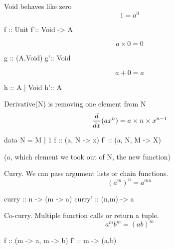 \documentclass{beamer}
\begin{document}







\begin{frame}[fragile]
Void behaves like zero
$$1= a^{0}$$
\begin{code}
f :: Unit
f':: Void -> A
\end{code}
$$a\times0 = 0$$
\begin{code}
g :: (A,Void)
g':: Void
\end{code}
$$a+0 = a$$
\begin{code}
h :: A | Void
h':: A
\end{code}
\end{frame}


\begin{frame}[fragile]
Derivative(N) is removing one element from N
$$ {d \over dx}(ax^{n}) = a \times n \times x^{n-1}$$
\begin{code}
data N = M | 1
f ::  (a, N -> x)
f' :: (a, N, M -> X)
\end{code}
($a$, which element we took out of N, the new function)
\end{frame}

\begin{frame}[fragile]
Curry. We can pass argument lists or chain functions.
$$ (a^{m})^{n} = a^{mn}$$

\begin{code}
curry :: n -> (m -> a)
curry' :: (n,m) -> a
\end{code}
\end{frame}

\begin{frame}[fragile]
Co-curry. Multiple function calls or return a tuple.
$$ a^{m}b^{m} = (ab)^{m}$$

\begin{code}
f :: (m -> a, m -> b)
f' :: m -> (a,b)
\end{code}
\end{frame}
\end{document}
